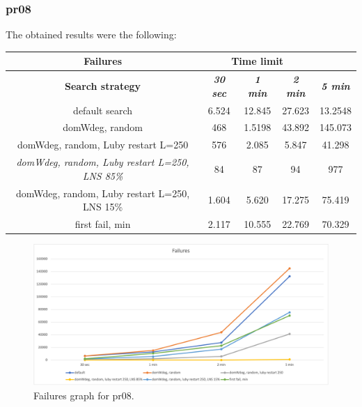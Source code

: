 \subsubsection{pr08}
The obtained results were the following:
{
\renewcommand{\arraystretch}{2}
\begin{longtable}[h]{| c | c | c | c | c |}
    \hline
    \textbf{Failures} & \multicolumn{3}{c}{Time limit} & \\
    \hline
    \textbf{Search strategy} & \textbf{\textit{30 sec}} & \textbf{\textit{1 min}} & \textbf{\textit{2 min}} & \textbf{\textit{5 min}} \\
    \hline
    \endhead
    default search                                         & 6.524 & 12.845 &  27.623 & 13.2548 \\
    \hline
    domWdeg, random                                        &  468 & 1.5198 &  43.892 & 145.073 \\
    \hline
    domWdeg, random, Luby restart L=250                    &  576 &  2.085 &   5.847 &  41.298 \\
    \hline
    \textit{domWdeg, random, Luby restart L=250, LNS 85\%} &   84 &    87 &     94 &    977 \\
    \hline
    domWdeg, random, Luby restart L=250, LNS 15\%          & 1.604 &  5.620 &  17.275 &  75.419 \\
    \hline
    first fail, min                                        & 2.117 & 10.555 &  22.769 &  70.329 \\
    \hline
\end{longtable}
}
\begin{figure}[H]
    \centering
    \includegraphics[width=1.0\columnwidth]{../graphs/pr08-failures.png}
    \caption{Failures graph for pr08.}
\end{figure}

